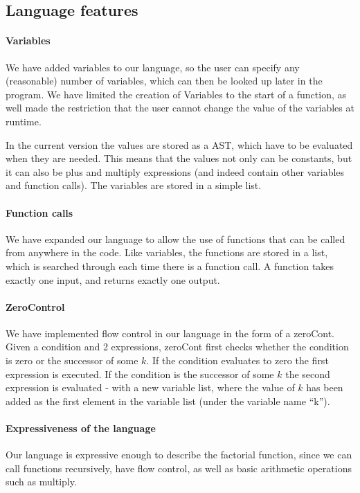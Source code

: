 \subsection{Language features}

\paragraph{Variables}
We have added variables to our language, so the user can specify any
(reasonable) number of variables, which can then be looked up later in
the program. We have limited the creation of Variables to the start of
a function, as well made the restriction that the user cannot change
the value of the variables at runtime.

In the current version the values are stored as a AST, which have to
be evaluated when they are needed. This means that the values not only
can be constants, but it can also be plus and multiply expressions
(and indeed contain other variables and function calls). The variables
are stored in a simple list.

\paragraph{Function calls}
We have expanded our language to allow the use of functions that can
be called from anywhere in the code. Like variables, the functions are
stored in a list, which is searched through each time there is a
function call. A function takes exactly one input, and returns exactly
one output.

\paragraph{ZeroControl}
We have implemented flow control in our language in the form of a
zeroCont. Given a condition and 2 expressions, zeroCont first checks
whether the condition is zero or the successor of some $k$. If the
condition evaluates to zero the first expression is executed. If the
condition is the successor of some $k$ the second expression is
evaluated - with a new variable list, where the value of $k$ has been
added as the first element in the variable list (under the variable
name ``k'').

\paragraph{Expressiveness of the language}
Our language is expressive enough to describe the factorial function,
since we can call functions recursively, have flow control, as well as
basic arithmetic operations such as multiply.

